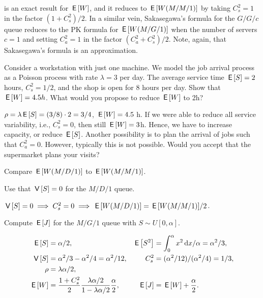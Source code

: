  
 is an exact result for $\,\mathsf{E}\left[W\right]$, and it reduces to $\,\mathsf{E}\left[W(M/M/1)\right]$ by taking
$C_s^2=1$ in the factor $(1+C_s^2)/2$.
In a similar vein, Sakasegawa's formula for the $G/G/c$ queue reduces to the PK formula for $\,\mathsf{E}\left[W(M/G/1)\right]$ when the number of servers $c=1$ and setting
 $C_a^2=1$ in the factor $(C_a^2+C_s^2)/2$.
Note, again, that Sakasegawa's formula is an approximation. 




\begin{exercise}\label{ex:l-241}
 Consider a workstation with just one machine.
 We model the job arrival process as a Poisson process with rate $\lambda=3$ per day.
 The average service time $\,\mathsf{E}\left[S\right] = 2$ hours, $C^2_s = 1/2$, and the shop is open for 8 hours per day.
Show that  $\,\mathsf{E}\left[W\right] = 4.5h$. What would you propose to reduce $\,\mathsf{E}\left[W\right]$ to 2h?
\begin{solution}
$\rho = \lambda \,\mathsf{E}\left[S\right] = (3/8)\cdot 2 = 3/4$, $\,\mathsf{E}\left[W\right] = 4.5$ h. 
If we were able to reduce all service variability, i.e., $C_s^2=0$, then still $\,\mathsf{E}\left[W\right] = 3$h.
Hence, we have to increase capacity, or reduce $\,\mathsf{E}\left[S\right]$.
Another possibility is to plan the arrival of jobs such that $C_a^2=0$.
However, typically this is not possible.
Would you accept that the supermarket plans your visits?
\end{solution}
\end{exercise}




\begin{exercise}
Compare  $\,\mathsf{E}\left[W(M/D/1)\right]$ to $\,\mathsf{E}\left[W(M/M/1)\right]$.
\begin{hint}
Use that $\,\mathsf{V}\left[S\right]=0$ for the $M/D/1$ queue.    
\end{hint}
\begin{solution}
$\,\mathsf{V}\left[S\right] = 0 \implies C_s^2 = 0 \implies \,\mathsf{E}\left[W(M/D/1)\right] = {\,\mathsf{E}\left[W(M/M/1)\right]}/2$.
\end{solution}
\end{exercise}

\begin{exercise}
 Compute $\,\mathsf{E}\left[J\right]$ for the $M/G/1$ queue with $S\sim U[0,\alpha]$.
\begin{solution}
 \begin{align*}
\,\mathsf{E}\left[S\right] &= \alpha/2, & \,\mathsf{E}\left[S^2\right] &= \int_0^\alpha x^2 \,\textrm{d}x/\alpha = \alpha^2/3,\\
\,\mathsf{V}\left[S\right] &= \alpha^2/3 - \alpha^2/4= \alpha^2/12, & C_s^2 &= (\alpha^2/12)/(\alpha^2/4) = 1/3,\\
\rho &= \lambda \alpha/2,\\
\,\mathsf{E}\left[W\right] &= \frac{1+C_s^2}2 \frac{\lambda \alpha/2}{1-\lambda \alpha/2}\frac \alpha2, &
\,\mathsf{E}\left[J\right] &= \,\mathsf{E}\left[W\right] + \frac \alpha2.
 \end{align*}
\end{solution}
\end{exercise}


